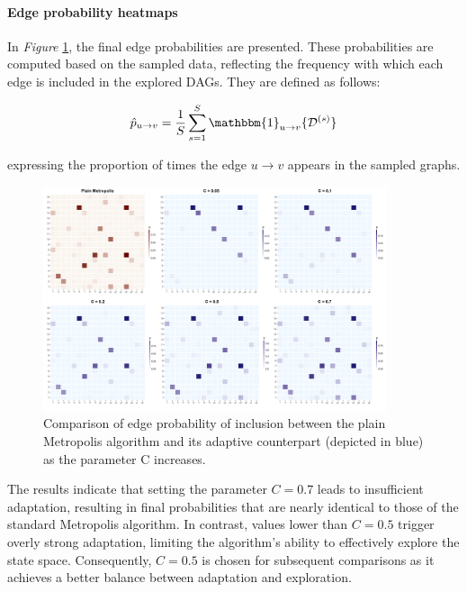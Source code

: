 \documentclass{report}
\begin{document}
\paragraph{Edge probability heatmaps}

In \textit{Figure} \ref{fig:c-heatmaps}, the final edge probabilities are presented. These probabilities are computed based on the sampled data, reflecting the frequency with which each edge is included in the explored DAGs. They are defined as follows:

\begin{equation} \label{edge-probs}
	\hat{p}_{u \rightarrow v} = \frac{1}{S} \sum_{s = 1}^S \mathbbm{1}_{u \rightarrow v}\{\mathcal{D}^{(s)} \}
\end{equation}

expressing the proportion of times the edge $u \rightarrow v$ appears in the sampled graphs.

\begin{figure}[h] 
	\centering
	\includegraphics[width=0.9\textwidth]{Figures/Adaptive_behaviour/heatmaps.png}
	\caption{Comparison of edge probability of inclusion between the plain Metropolis algorithm and its adaptive counterpart (depicted in blue) as the parameter C increases.}
	\label{fig:c-heatmaps}
\end{figure}

The results indicate that setting the parameter $C=0.7$ leads to insufficient adaptation, resulting in final probabilities that are nearly identical to those of the standard Metropolis algorithm.  In contrast, values lower than $C=0.5$ trigger overly strong adaptation, limiting the algorithm’s ability to effectively explore the state space. Consequently, $C=0.5$ is chosen for subsequent comparisons as it achieves a better balance between adaptation and exploration.
\end{document}
